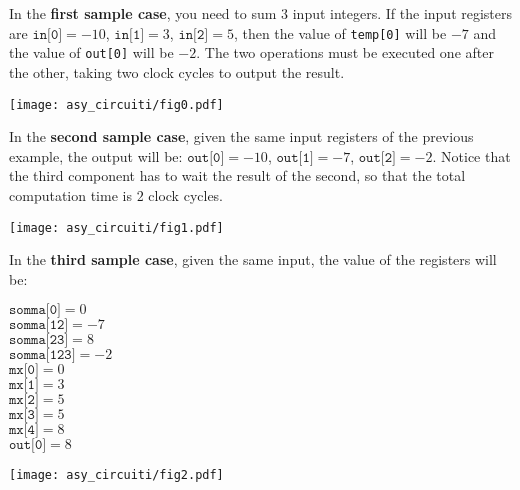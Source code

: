 \Explanation

In the \textbf{first sample case}, you need to sum $3$ input integers. If the input registers are $\texttt{in[0]} = -10$, $\texttt{in[1]} = 3$, $\texttt{in[2]} = 5$, then the value of \texttt{temp[0]} will be $-7$ and the value of \texttt{out[0]} will be $-2$. The two operations must be executed one after the other, taking two clock cycles to output the result.
\begin{center}
	\vspace{-5pt}
	\texttt{[image: asy\_circuiti/fig0.pdf]}
	\vspace{-5pt}
\end{center}
In the \textbf{second sample case}, given the same input registers of the previous example, the output will be: $\texttt{out[0]} = -10$, $\texttt{out[1]} = -7$, $\texttt{out[2]} = -2$. Notice that the third component has to wait the result of the second, so that the total computation time is $2$ clock cycles.
\begin{center}
	\vspace{-5pt}
	\texttt{[image: asy\_circuiti/fig1.pdf]}
	\vspace{-5pt}
\end{center}
In the \textbf{third sample case}, given the same input, the value of the registers will be:
\begin{multicols}{3}
	$\texttt{somma[0]} = 0$ \\
	$\texttt{somma[12]} = -7$ \\
	$\texttt{somma[23]} = 8$ \\
	$\texttt{somma[123]} = -2$ \\
	$\texttt{mx[0]} = 0$ \\
	$\texttt{mx[1]} = 3$ \\
	$\texttt{mx[2]} = 5$ \\
	$\texttt{mx[3]} = 5$ \\
	$\texttt{mx[4]} = 8$ \\
	$\texttt{out[0]} = 8$ \\
\end{multicols}
\begin{center}
	\texttt{[image: asy\_circuiti/fig2.pdf]}
\end{center}
